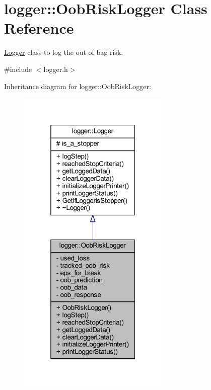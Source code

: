 \hypertarget{classlogger_1_1_oob_risk_logger}{}\section{logger\+:\+:Oob\+Risk\+Logger Class Reference}
\label{classlogger_1_1_oob_risk_logger}


\mbox{\hyperlink{classlogger_1_1_logger}{Logger}} class to log the out of bag risk.  




{\ttfamily \#include $<$logger.\+h$>$}



Inheritance diagram for logger\+:\+:Oob\+Risk\+Logger\+:\nopagebreak
\begin{figure}[H]
\begin{center}
\leavevmode
\includegraphics[width=205pt]{classlogger_1_1_oob_risk_logger__inherit__graph}
\end{center}
\end{figure}


